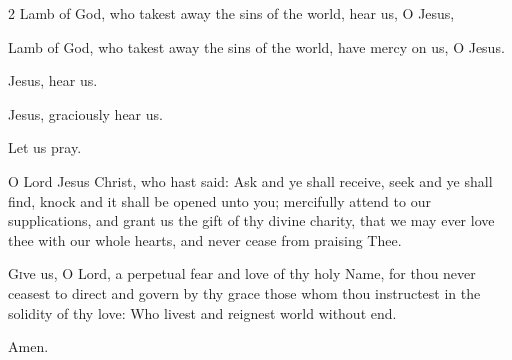\begin{enpars}
\begin{multicols}{2}
Lamb of God, who takest away the sins of the world, hear us, O Jesus,

Lamb of God, who takest away the sins of the world, have mercy on us, O Jesus.

\end{multicols}

\vv Jesus, hear us.

\rr Jesus, graciously hear us.

Let us pray. \nopagebreak

\lettrine{O}{} Lord Jesus Christ, who hast said: Ask and ye shall receive, seek and ye shall find, knock and it shall be opened unto you; mercifully attend to our supplications, and grant us the gift of thy divine charity, that we may ever love thee with our whole hearts, and never cease from praising Thee.

\lettrine{G}{i}ve us, O Lord, a perpetual fear and love of thy holy Name, for thou never ceasest to direct and govern by thy grace those whom thou instructest in the solidity of thy love: Who livest and reignest world without end.

\rr Amen.
\end{enpars}